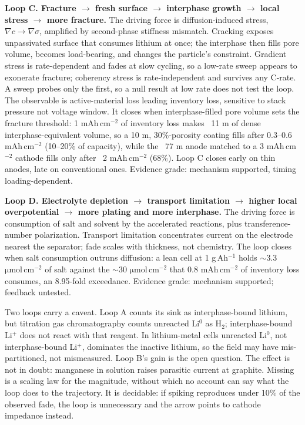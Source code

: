 \textbf{Loop C. Fracture $\rightarrow$ fresh surface $\rightarrow$ interphase growth $\rightarrow$ local stress $\rightarrow$ more fracture.} The driving force is diffusion-induced stress, $\nabla c \rightarrow \nabla\sigma$, amplified by second-phase stiffness mismatch.\cite{pandurangi2023chemo,deshpande2017modeling} Cracking exposes unpassivated surface that consumes lithium at once; the interphase then fills pore volume, becomes load-bearing, and changes the particle's constraint.\cite{ai2022coupled,carelli2022coupling} Gradient stress is rate-dependent and fades at slow cycling, so a low-rate sweep appears to exonerate fracture; coherency stress is rate-independent and survives any C-rate. A sweep probes only the first, so a null result at low rate does not test the loop. The observable is active-material loss leading inventory loss, sensitive to stack pressure not voltage window. It closes when interphase-filled pore volume sets the fracture threshold: 1 mAh\,cm$^{-2}$ of inventory loss makes ~11 \textmu m of dense interphase-equivalent volume, so a 10 \textmu m, 30\%-porosity coating fills after 0.3--0.6 mAh\,cm$^{-2}$ (10--20\% of capacity), while the ~77 \textmu m anode matched to a 3 mAh\,cm$^{-2}$ cathode fills only after ~2 mAh\,cm$^{-2}$ (68\%). Loop C closes early on thin anodes, late on conventional ones. Evidence grade: mechanism supported, timing loading-dependent.

\textbf{Loop D. Electrolyte depletion $\rightarrow$ transport limitation $\rightarrow$ higher local overpotential $\rightarrow$ more plating and more interphase.} The driving force is consumption of salt and solvent by the accelerated reactions, plus transference-number polarization.\cite{lithiummetal2026science,fang2019quantifying} Transport limitation concentrates current on the electrode nearest the separator; fade scales with thickness, not chemistry. The loop closes when salt consumption outruns diffusion: a lean cell at 1 g\,Ah$^{-1}$ holds $\sim$3.3 $\mathrm{\mu mol\,cm^{-2}}$ of salt against the $\sim$30 $\mathrm{\mu mol\,cm^{-2}}$ that 0.8 mAh\,cm$^{-2}$ of inventory loss consumes, an 8.95-fold exceedance. Evidence grade: mechanism supported; feedback untested.

Two loops carry a caveat. Loop A counts its sink as interphase-bound lithium, but titration gas chromatography counts unreacted Li$^{0}$ as H$_2$; interphase-bound Li$^{+}$ does not react with that reagent.\cite{smith2010precision} In lithium-metal cells unreacted Li$^{0}$, not interphase-bound Li$^{+}$, dominates the inactive lithium, so the field may have mis-partitioned, not mismeasured. Loop B's gain is the open question. The effect is not in doubt: manganese in solution raises parasitic current at graphite.\cite{dubarry2012synthesize} Missing is a scaling law for the magnitude, without which no account can say what the loop does to the trajectory. It is decidable: if spiking reproduces under 10\% of the observed fade, the loop is unnecessary and the arrow points to cathode impedance instead.

